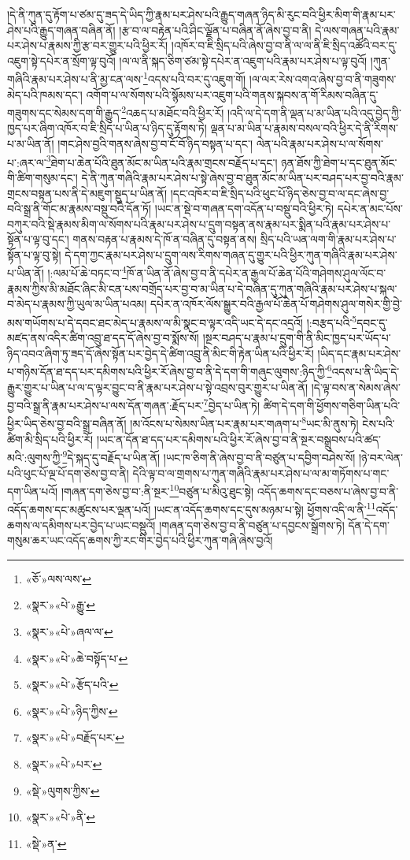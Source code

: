 །དེ་ནི་ཀུན་དུ་རྟོག་པ་ཙམ་དུ་ཟད་དེ་ཡིད་ཀྱི་རྣམ་པར་ཤེས་པའི་རྒྱུད་གཞན་ཉིད་མི་རུང་བའི་ཕྱིར་མིག་གི་རྣམ་པར་ཤེས་པའི་རྒྱུད་གཞན་བཞིན་ནོ། །རྩ་བ་ལ་བརྟེན་པའི་ཤིང་ལྗོན་པ་བཞིན་ནོ་ཞེས་བྱ་བ་ནི། དེ་ལས་གཞན་པའི་རྣམ་པར་ཤེས་པ་རྣམས་ཀྱི་རྩ་བར་གྱུར་པའི་ཕྱིར་རོ། །འཁོར་བ་ཇི་སྲིད་པའི་ཞེས་བྱ་བ་ནི་ལ་ལ་ནི་ཇི་སྲིད་འཚོའི་བར་དུ་འཇུག་སྟེ་དཔེར་ན་སྲོག་ལྟ་བུའོ། །ལ་ལ་ནི་སྐད་ཅིག་ཙམ་སྟེ་དཔེར་ན་འཇུག་པའི་རྣམ་པར་ཤེས་པ་ལྟ་བུའོ། །ཀུན་གཞིའི་རྣམ་པར་ཤེས་པ་ནི་མྱ་ངན་ལས་\footnote{«ཅོ་»ལས་ལས་}འདས་པའི་བར་དུ་འཇུག་གོ། །ལ་ལར་རེས་འགའ་ཞེས་བྱ་བ་ནི་གཟུགས་མེད་པའི་ཁམས་དང་། འགོག་པ་ལ་སོགས་པའི་སྙོམས་པར་འཇུག་པའི་གནས་སྐབས་ན་གོ་རིམས་བཞིན་དུ་གཟུགས་དང་སེམས་དག་གི་རྒྱུད་\footnote{«སྣར་»«པེ་»རྒྱུ་}འཆད་པ་མཐོང་བའི་ཕྱིར་རོ། །འདི་ལ་དེ་དག་ནི་ལྡན་པ་མ་ཡིན་པའི་འདུ་བྱེད་ཀྱི་ཁྱད་པར་ཞིག་འཁོར་བ་ཇི་སྲིད་པ་ཡིན་པ་ཉིད་དུ་རྟོགས་ཏེ། ལྡན་པ་མ་ཡིན་པ་རྣམས་བསལ་བའི་ཕྱིར་དེ་ནི་རིགས་པ་མ་ཡིན་ནོ། །གང་ཤེས་བྱའི་གནས་ཞེས་བྱ་བ་ངོ་བོ་ཉིད་བསྟན་པ་དང་། ལེན་པའི་རྣམ་པར་ཤེས་པ་ལ་སོགས་པ་:ཞར་ལ་\footnote{«སྣར་»«པེ་»ཞལ་ལ་}ཐེག་པ་ཆེན་པོའི་ཐུན་མོང་མ་ཡིན་པའི་རྣམ་གྲངས་བརྗོད་པ་དང་། ཉན་ཐོས་ཀྱི་ཐེག་པ་དང་ཐུན་མོང་གི་ཚིག་གསུམ་དང་། དེ་ནི་ཀུན་གཞིའི་རྣམ་པར་ཤེས་པ་སྟེ་ཞེས་བྱ་བ་ཐུན་མོང་མ་ཡིན་པར་བཤད་པར་བྱ་བའི་རྣམ་གྲངས་བསྟན་པས་ནི་དེ་མཇུག་སྡུད་པ་ཡིན་ནོ། །དང་འཁོར་བ་ཇི་སྲིད་པའི་ཕུང་པོ་ཉིད་ཅེས་བྱ་བ་ལ་དང་ཞེས་བྱ་བའི་སྒྲ་ནི་གོང་མ་རྣམས་བསྡུ་བའི་དོན་ཏོ། །ཡང་ན་སྡེ་བ་གཞན་དག་འདོན་པ་བསྡུ་བའི་ཕྱིར་ཏེ། དཔེར་ན་མང་པོས་བཀུར་བའི་སྡེ་རྣམས་མིག་ལ་སོགས་པའི་རྣམ་པར་ཤེས་པ་དྲུག་བསྟན་ནས་རྣམ་པར་སྨིན་པའི་རྣམ་པར་ཤེས་པ་སྟོན་པ་ལྟ་བུ་དང་། གནས་བརྟན་པ་རྣམས་དེ་ཁོ་ན་བཞིན་དུ་བསྟན་ནས། སྲིད་པའི་ཡན་ལག་གི་རྣམ་པར་ཤེས་པ་སྟོན་པ་ལྟ་བུ་སྟེ། དེ་དག་ཀྱང་རྣམ་པར་ཤེས་པ་དྲུག་ལས་རིགས་གཞན་དུ་གྱུར་པའི་ཕྱིར་ཀུན་གཞིའི་རྣམ་པར་ཤེས་པ་ཡིན་ནོ། །:ལམ་པོ་ཆེ་བཏང་བ་\footnote{«སྣར་»«པེ་»ཆེ་བསྟོད་པ་}ཁོ་ན་ཡིན་ནོ་ཞེས་བྱ་བ་ནི་དཔེར་ན་རྒྱལ་པོ་ཆེན་པོའི་གཤེགས་ཤུལ་ལོང་བ་རྣམས་ཀྱིས་མི་མཐོང་ཞིང་མི་ངན་པས་བགྲོད་པར་བྱ་བ་མ་ཡིན་པ་དེ་བཞིན་དུ་ཀུན་གཞིའི་རྣམ་པར་ཤེས་པ་སྐལ་བ་མེད་པ་རྣམས་ཀྱི་ཡུལ་མ་ཡིན་པའམ། དཔེར་ན་འཁོར་ལོས་སྒྱུར་བའི་རྒྱལ་པོ་ཆེན་པོ་གཤེགས་ཤུལ་གསེར་གྱི་བྱེ་མས་གཡོགས་པ་དེ་དབང་ཐང་མེད་པ་རྣམས་ལ་མི་སྣང་བ་ལྟར་འདི་ཡང་དེ་དང་འདྲའོ། །:བརྩད་པའི་\footnote{«སྣར་»«པེ་»རྩོད་པའི་}དབང་དུ་མཛད་ནས་འདིར་ཚིག་འབྲུ་ཐ་དད་དོ་ཞེས་བྱ་བ་སྨོས་སོ། །སྔར་བཤད་པ་རྣམ་པ་དྲུག་གི་ནི་མིང་ཁྱད་པར་ཡོད་པ་ཉིད་འབའ་ཞིག་ཏུ་ཟད་དོ་ཞེས་སྟོན་པར་བྱེད་དེ་ཚིག་འབྲུ་ནི་མིང་གི་རྟེན་ཡིན་པའི་ཕྱིར་རོ། །ཡིད་དང་རྣམ་པར་ཤེས་པ་གཉིས་དོན་ཐ་དད་པར་དམིགས་པའི་ཕྱིར་རོ་ཞེས་བྱ་བ་ནི་དེ་དག་གི་གཞུང་ལུགས་:ཉིད་ཀྱི་\footnote{«སྣར་»«པེ་»ཉིད་ཀྱིས་}འདས་པ་ནི་ཡིད་དེ་རྒྱུར་གྱུར་པ་ཡིན་པ་ལ་ད་ལྟར་བྱུང་བ་ནི་རྣམ་པར་ཤེས་པ་སྟེ་འབྲས་བུར་གྱུར་པ་ཡིན་ནོ། །དེ་ལྟ་བས་ན་སེམས་ཞེས་བྱ་བའི་སྒྲ་ནི་རྣམ་པར་ཤེས་པ་ལས་དོན་གཞན་:རྗོད་པར་\footnote{«སྣར་»«པེ་»བརྗོད་པར་}བྱེད་པ་ཡིན་ཏེ། ཚིག་དེ་དག་གི་ཕྱོགས་གཅིག་ཡིན་པའི་ཕྱིར་ཡིད་ཅེས་བྱ་བའི་སྒྲ་བཞིན་ནོ། །མ་འོངས་པ་སེམས་ཡིན་པར་རྣམ་པར་གཞག་པ་\footnote{«སྣར་»«པེ་»པར་}ཡང་མི་ནུས་ཏེ། ངེས་པའི་ཚིག་མི་སྲིད་པའི་ཕྱིར་རོ། །ཡང་ན་དོན་ཐ་དད་པར་དམིགས་པའི་ཕྱིར་རོ་ཞེས་བྱ་བ་ནི་སྔར་བསྒྲུབས་པའི་ཚད་མའི་:ལུགས་ཀྱི་\footnote{«སྡེ་»ལུགས་ཀྱིས་}དེ་སྐད་དུ་བརྗོད་པ་ཡིན་ནོ། །ཡང་ཁ་ཅིག་ནི་ཞེས་བྱ་བ་ནི་བཙུན་པ་དབྱིག་བཤེས་སོ། །ཉེ་བར་ལེན་པའི་ཕུང་པོ་ལྔ་པོ་དག་ཅེས་བྱ་བ་ནི། དེའི་ལྟ་བ་ལ་གྲགས་པ་ཀུན་གཞིའི་རྣམ་པར་ཤེས་པ་ལ་མ་གཏོགས་པ་གང་དག་ཡིན་པའོ། །གཞན་དག་ཅེས་བྱ་བ་:ནི་སྔར་\footnote{«སྣར་»«པེ་»ནི་}བཙུན་པ་མིའུ་ཐུང་སྟེ། འདོད་ཆགས་དང་བཅས་པ་ཞེས་བྱ་བ་ནི་འདོད་ཆགས་དང་མཚུངས་པར་ལྡན་པའོ། །ཡང་ན་འདོད་ཆགས་དང་དུས་མཉམ་པ་སྟེ། ཕྱོགས་འདི་ལ་ནི་\footnote{«སྡེ་»ན་}འདོད་ཆགས་ལ་དམིགས་པར་བྱེད་པ་ཡང་བསྡུའོ། །གཞན་དག་ཅེས་བྱ་བ་ནི་བཙུན་པ་དབྱངས་སྒྲོགས་ཏེ། དོན་དེ་དག་གསུམ་ཆར་ཡང་འདོད་ཆགས་ཀྱི་རང་གིར་བྱེད་པའི་ཕྱིར་ཀུན་གཞི་ཞེས་བྱའོ། 